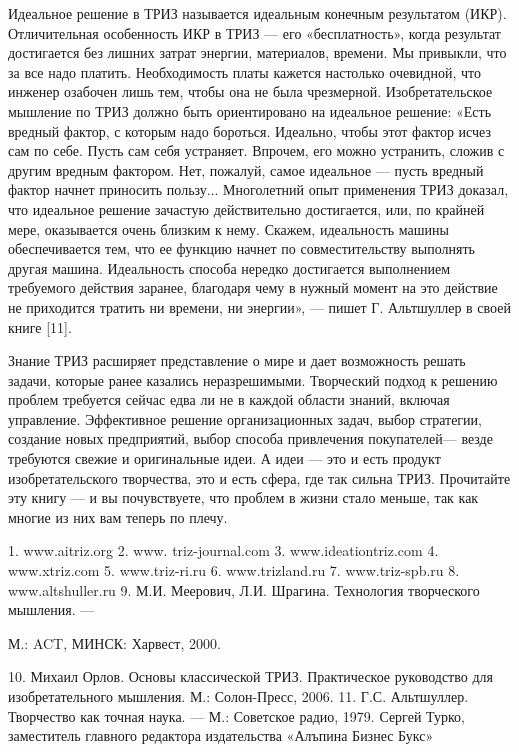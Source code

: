 Идеальное  решение в  ТРИЗ называется  идеальным конечным  результатом
(ИКР).  Отличительная особенность  ИКР  в ТРИЗ  — его  «бесплатность»,
когда  результат достигается  без лишних  затрат энергии,  материалов,
времени. Мы  привыкли, что  за все  надо платить.  Необходимость платы
кажется настолько очевидной, что инженер  озабочен лишь тем, чтобы она
не  была чрезмерной.  Изобретательское  мышление по  ТРИЗ должно  быть
ориентировано на  идеальное решение:  «Есть вредный фактор,  с которым
надо бороться.  Идеально, чтобы этот  фактор исчез сам по  себе. Пусть
сам  себя устраняет.  Впрочем, его  можно устранить,  сложив с  другим
вредным фактором. Нет, пожалуй, самое идеальное — пусть вредный фактор
начнет приносить  пользу... Многолетний опыт применения  ТРИЗ доказал,
что  идеальное решение  зачастую  действительно  достигается, или,  по
крайней мере,  оказывается очень  близким к нему.  Скажем, идеальность
машины обеспечивается  тем, что ее функцию  начнет по совместительству
выполнять  другая  машина.  Идеальность  способа  нередко  достигается
выполнением  требуемого  действия  заранее, благодаря  чему  в  нужный
момент на это действие не  приходится тратить ни времени, ни энергии»,
— пишет Г. Альтшуллер в своей книге [11].

Знание ТРИЗ расширяет  представление о мире и  дает возможность решать
задачи,  которые ранее  казались  неразрешимыми.  Творческий подход  к
решению проблем требуется  сейчас едва ли не в  каждой области знаний,
включая управление.  Эффективное решение организационных  задач, выбор
стратегии,  создание  новых  предприятий,  выбор  способа  привлечения
покупателей— везде требуются свежие и  оригинальные идеи. А идеи — это
и есть продукт изобретательского творчества, это и есть сфера, где так
сильна ТРИЗ. Прочитайте  эту книгу — и вы почувствуете,  что проблем в
жизни стало меньше, так как многие из них вам теперь по плечу.

1. www.aitriz.org
2. www. triz-journal.com
3. www.ideationtriz.com
4. www.xtriz.com
5. www.triz-ri.ru
6. www.trizland.ru
7. www.triz-spb.ru
8. www.altshuller.ru
9. М.И. Меерович, Л.И. Шрагина. Технология творческого мышления. —

М.: ACT, МИНСК: Харвест, 2000.



10. Михаил Орлов. Основы классической ТРИЗ. Практическое руководство
для изобретательного мышления. М.: Солон-Пресс, 2006.
11. Г.С. Альтшуллер. Творчество как точная наука. — М.: Советское радио,
1979.
Сергей Турко,
заместитель главного редактора
издательства «Алъпина Бизнес Букс»

